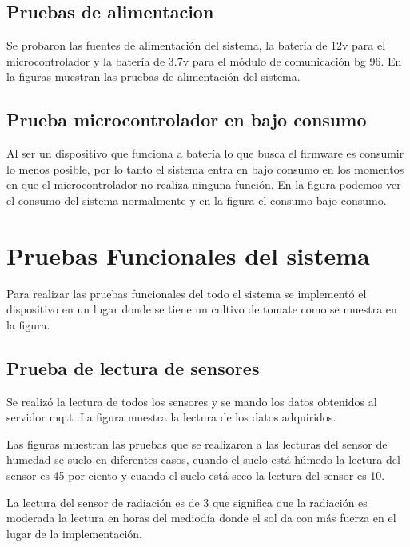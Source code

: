 \subsection{Pruebas de alimentacion }
Se probaron las fuentes de alimentación del sistema, la batería de 12v para el microcontrolador y la batería de 3.7v para el módulo de comunicación bg 96.
En la figuras muestran las pruebas de alimentación del sistema.


\subsection{Prueba microcontrolador en bajo consumo }
Al ser un dispositivo que funciona a batería lo que busca el firmware es consumir lo menos posible, por lo tanto el sistema entra en bajo consumo en los momentos en que el microcontrolador no realiza ninguna función. 
En la figura podemos ver el consumo del sistema normalmente y en la figura el consumo bajo consumo.




\clearpage 
\section{Pruebas Funcionales del sistema}
Para realizar las pruebas funcionales del todo el sistema se implementó el dispositivo en un lugar donde se tiene un cultivo de tomate como se muestra en la figura.

\subsection{Prueba de lectura de sensores}
Se realizó la lectura de todos los sensores y se mando los datos obtenidos al servidor mqtt .La figura muestra la lectura de los datos adquiridos.

Las figuras muestran las pruebas que se realizaron a las lecturas del sensor de humedad se suelo en diferentes casos, cuando el suelo está húmedo la lectura del sensor es  45 por ciento y cuando el suelo está seco la lectura del sensor es 10.

La lectura del sensor de radiación es de 3 que significa que la radiación es moderada la lectura en horas del mediodía donde el sol da con más fuerza en el lugar de la implementación.


